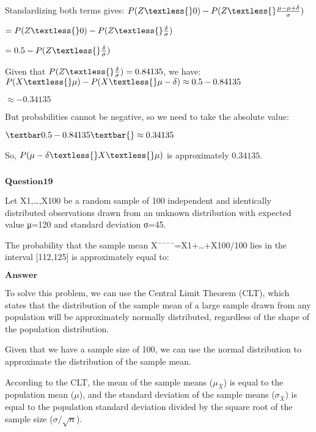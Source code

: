 \documentclass[11pt]{article}
\makeatletter
\newcommand{\boxspacing}{\kern\kvtcb@left@rule\kern\kvtcb@boxsep}
\newcommand{\prompt}[4]{
        {\ttfamily\llap{{\color{#2}[#3]:\hspace{3pt}#4}}\vspace{-\baselineskip}}
    }
\makeatother
\begin{document}
Standardizing both terms gives: $ P(Z \textless{} 0) - P(Z \textless{}
\frac{\mu - \mu + \delta}{\sigma}) $

$ = P(Z \textless{} 0) - P(Z \textless{} \frac{\delta}{\sigma}) $

$ = 0.5 - P(Z \textless{} \frac{\delta}{\sigma}) $

Given that $ P(Z \textless{} \frac{\delta}{\sigma}) = 0.84135 $, we
have: $ P(X \textless{} \mu) - P(X \textless{} \mu - \delta)
\approx 0.5 - 0.84135 $

$ \approx -0.34135 $

But probabilities cannot be negative, so we need to take the absolute
value:

$ \textbar0.5 - 0.84135\textbar{} \approx 0.34135 $

So, $ P(\mu - \delta \textless{} X \textless{} \mu) $ is approximately
$ 0.34135 $.

    \begin{tcolorbox}[breakable, size=fbox, boxrule=1pt, pad at break*=1mm,colback=cellbackground, colframe=cellborder]
\prompt{In}{incolor}{ }{\boxspacing}
\begin{Verbatim}[commandchars=\\\{\}]

\end{Verbatim}
\end{tcolorbox}

    $\textbf{Question19}$

Let X1,\ldots,X100 be a random sample of 100 independent and identically
distributed observations drawn from an unknown distribution with
expected value μ=120 and standard deviation σ=45.

The probability that the sample mean X¯¯¯¯=X1+\ldots+X100/100 lies in
the interval {[}112,125{]} is approximately equal to:

$\textbf{Answer}$

    To solve this problem, we can use the Central Limit Theorem (CLT), which
states that the distribution of the sample mean of a large sample drawn
from any population will be approximately normally distributed,
regardless of the shape of the population distribution.

Given that we have a sample size of 100, we can use the normal
distribution to approximate the distribution of the sample mean.

According to the CLT, the mean of the sample means ($ \mu_{\bar{X}} $) is equal to the population mean ($ \mu $), and the standard deviation of the sample means ($ \sigma_{\bar{X}} $) is equal to the population standard deviation divided by the square root of the sample size ($ \sigma / \sqrt{n} $).
\end{document}
